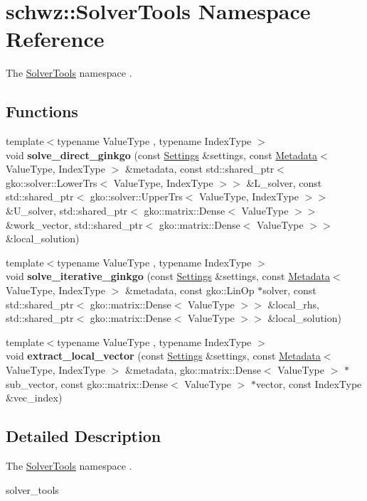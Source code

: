 \hypertarget{namespaceschwz_1_1SolverTools}{}\section{schwz\+:\+:Solver\+Tools Namespace Reference}
\label{namespaceschwz_1_1SolverTools}


The \hyperlink{namespaceschwz_1_1SolverTools}{Solver\+Tools} namespace .  


\subsection*{Functions}
\begin{DoxyCompactItemize}
\item 
\mbox{\label{namespaceschwz_1_1SolverTools_ae0eb9798ac886b0e45c304a97fe70176}} 
{\footnotesize template$<$typename Value\+Type , typename Index\+Type $>$ }\\void {\bfseries solve\+\_\+direct\+\_\+ginkgo} (const \hyperlink{structschwz_1_1Settings}{Settings} \&settings, const \hyperlink{structschwz_1_1Metadata}{Metadata}$<$ Value\+Type, Index\+Type $>$ \&metadata, const std\+::shared\+\_\+ptr$<$ gko\+::solver\+::\+Lower\+Trs$<$ Value\+Type, Index\+Type $>$$>$ \&L\+\_\+solver, const std\+::shared\+\_\+ptr$<$ gko\+::solver\+::\+Upper\+Trs$<$ Value\+Type, Index\+Type $>$$>$ \&U\+\_\+solver, std\+::shared\+\_\+ptr$<$ gko\+::matrix\+::\+Dense$<$ Value\+Type $>$$>$ \&work\+\_\+vector, std\+::shared\+\_\+ptr$<$ gko\+::matrix\+::\+Dense$<$ Value\+Type $>$$>$ \&local\+\_\+solution)
\item 
\mbox{\label{namespaceschwz_1_1SolverTools_a1440fb698413c788cfcd0f2526b33d81}} 
{\footnotesize template$<$typename Value\+Type , typename Index\+Type $>$ }\\void {\bfseries solve\+\_\+iterative\+\_\+ginkgo} (const \hyperlink{structschwz_1_1Settings}{Settings} \&settings, const \hyperlink{structschwz_1_1Metadata}{Metadata}$<$ Value\+Type, Index\+Type $>$ \&metadata, const gko\+::\+Lin\+Op $\ast$solver, const std\+::shared\+\_\+ptr$<$ gko\+::matrix\+::\+Dense$<$ Value\+Type $>$$>$ \&local\+\_\+rhs, std\+::shared\+\_\+ptr$<$ gko\+::matrix\+::\+Dense$<$ Value\+Type $>$$>$ \&local\+\_\+solution)
\item 
\mbox{\label{namespaceschwz_1_1SolverTools_a193e789c220cc7675b4cd7da073f3779}} 
{\footnotesize template$<$typename Value\+Type , typename Index\+Type $>$ }\\void {\bfseries extract\+\_\+local\+\_\+vector} (const \hyperlink{structschwz_1_1Settings}{Settings} \&settings, const \hyperlink{structschwz_1_1Metadata}{Metadata}$<$ Value\+Type, Index\+Type $>$ \&metadata, gko\+::matrix\+::\+Dense$<$ Value\+Type $>$ $\ast$sub\+\_\+vector, const gko\+::matrix\+::\+Dense$<$ Value\+Type $>$ $\ast$vector, const Index\+Type \&vec\+\_\+index)
\end{DoxyCompactItemize}


\subsection{Detailed Description}
The \hyperlink{namespaceschwz_1_1SolverTools}{Solver\+Tools} namespace . 

solver\+\_\+tools 